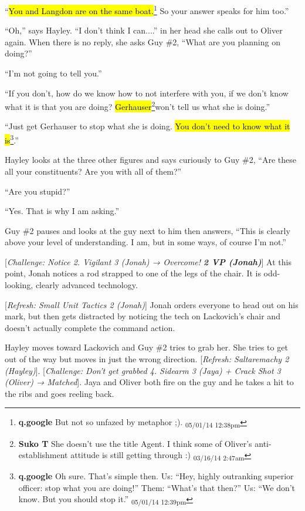 ``\hl{You and Langdon are on the same boat.}\footnote{\textbf{q.google }But not so unfazed by metaphor ;). \textsubscript{05/01/14 12:38pm}}  So your answer speaks for him too.''

``Oh,'' says Hayley. ``I don't think I can....''  in her head she calls out to Oliver again.  When there is no reply, she asks Guy \#2, ``What are you planning on doing?''

``I'm not going to tell you.''

``If you don't, how do we know how to not interfere with you, if we don't know what it is that you are doing?  \hl{Gerhauser}\footnote{\textbf{Suko T }She doesn't use the title Agent.  I think some of Oliver's anti-establishment attitude is still getting through :) \textsubscript{03/16/14 2:47am}}won't tell us what she is doing.''

``Just get Gerhauser to stop what she is doing.  \hl{You don't need to know what it is}\footnote{\textbf{q.google }Oh sure.  That's simple then.  Us: ``Hey, highly outranking superior officer: stop what you are doing!''
Them: ``What's that then?''
Us: ``We don't know.  But you should stop it.'' \textsubscript{05/01/14 12:39pm}}.''



Hayley looks at the three other figures and says curiously to Guy \#2, ``Are these all your constituents?  Are you with all of them?''

``Are you stupid?''

``Yes.  That is why I am asking.''

Guy \#2 pauses and looks at the guy next to him then answers, ``This is clearly above your level of understanding.  I am, but in some ways, of course I'm not.''



{[}\textit{Challenge: Notice 2.  Vigilant 3 (Jonah)  → Overcome! }\textit{\textbf{2 VP (Jonah)}}{]}  At this point, Jonah notices a rod strapped to one of the legs of the chair.  It is odd-looking, clearly advanced technology.



{[}\textit{Refresh: Small Unit Tactics 2 (Jonah)}{]}  Jonah orders everyone to head out on his mark, but then gets distracted by noticing the tech on Lackovich's chair and doesn't actually complete the command action.



Hayley moves toward Lackovich and Guy \#2 tries to grab her.  She tries to get out of the way but moves in just the wrong direction.  {[}\textit{Refresh: Saltaremachy 2 (Hayley)}{]}.  {[}\textit{Challenge: Don't get grabbed 4.  Sidearm 3 (Jaya) + Crack Shot 3 (Oliver) → Matched}{]}.  Jaya and Oliver both fire on the guy and he takes a hit to the ribs and goes reeling back.




